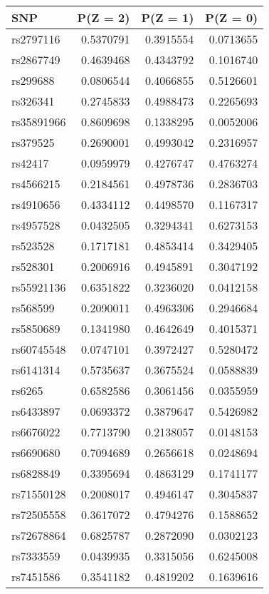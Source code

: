 \documentclass[
]{article}
\theoremstyle{plain}
\begin{document}
\begin{table}[H]
\begin{minipage}{0.5\linewidth}
\begin{tabular}{lrrr}
\toprule
SNP & P(Z = 2) & P(Z = 1) & P(Z = 0)\\
\midrule
rs2797116 & 0.5370791 & 0.3915554 & 0.0713655\\
rs2867749 & 0.4639468 & 0.4343792 & 0.1016740\\
rs299688 & 0.0806544 & 0.4066855 & 0.5126601\\
rs326341 & 0.2745833 & 0.4988473 & 0.2265693\\
rs35891966 & 0.8609698 & 0.1338295 & 0.0052006\\
\addlinespace
rs379525 & 0.2690001 & 0.4993042 & 0.2316957\\
rs42417 & 0.0959979 & 0.4276747 & 0.4763274\\
rs4566215 & 0.2184561 & 0.4978736 & 0.2836703\\
rs4910656 & 0.4334112 & 0.4498570 & 0.1167317\\
rs4957528 & 0.0432505 & 0.3294341 & 0.6273153\\
\addlinespace
rs523528 & 0.1717181 & 0.4853414 & 0.3429405\\
rs528301 & 0.2006916 & 0.4945891 & 0.3047192\\
rs55921136 & 0.6351822 & 0.3236020 & 0.0412158\\
rs568599 & 0.2090011 & 0.4963306 & 0.2946684\\
rs5850689 & 0.1341980 & 0.4642649 & 0.4015371\\
\addlinespace
rs60745548 & 0.0747101 & 0.3972427 & 0.5280472\\
rs6141314 & 0.5735637 & 0.3675524 & 0.0588839\\
rs6265 & 0.6582586 & 0.3061456 & 0.0355959\\
rs6433897 & 0.0693372 & 0.3879647 & 0.5426982\\
rs6676022 & 0.7713790 & 0.2138057 & 0.0148153\\
\addlinespace
rs6690680 & 0.7094689 & 0.2656618 & 0.0248694\\
rs6828849 & 0.3395694 & 0.4863129 & 0.1741177\\
rs71550128 & 0.2008017 & 0.4946147 & 0.3045837\\
rs72505558 & 0.3617072 & 0.4794276 & 0.1588652\\
rs72678864 & 0.6825787 & 0.2872090 & 0.0302123\\
\addlinespace
rs7333559 & 0.0439935 & 0.3315056 & 0.6245008\\
rs7451586 & 0.3541182 & 0.4819202 & 0.1639616\\

\end{tabular}
\end{minipage}
\end{table}
\end{document}
